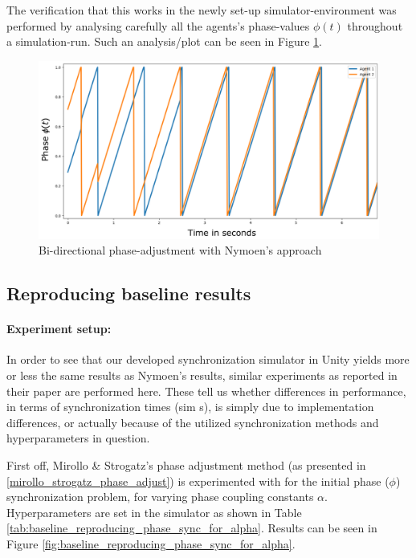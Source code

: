 		The verification that this works in the newly set-up simulator-environment was performed by analysing carefully all the agents's phase-values $\phi(t)$ throughout a simulation-run. Such an analysis/plot can be seen in Figure \ref{fig:nymoen_phase}.
		
		\begin{figure}[h]
			\centering
			\includegraphics[width=0.9\linewidth]{Assets/DocSegments/Chapters/ExperimentsAndResults/Figures/Validations/KNymoenPhaseAdjustmentSecondTry.pdf}
			\caption[Illustration of Nymoen's bi-directional phase adjustment ($Adj_{\phi}$) method.]{Bi-directional phase-adjustment with Nymoen's approach}
			\label{fig:nymoen_phase}
		\end{figure}
	
	\subsection{Reproducing baseline results}
	
		\paragraph{Experiment setup:\nl}
		
		In order to see that our developed synchronization simulator in Unity yields more or less the same results as Nymoen's results, similar experiments as reported in their paper are performed here. These tell us whether differences in performance, in terms of synchronization times (sim s), is simply due to implementation differences, or actually because of the utilized synchronization methods and hyperparameters in question. 
		
		First off, Mirollo \& Strogatz's phase adjustment method (as presented in \ref{mirollo_strogatz_phase_adjust}) is experimented with for the initial phase ($\phi$) synchronization problem, for varying phase coupling constants $\alpha$. Hyperparameters are set in the simulator as shown in Table \ref{tab:baseline_reproducing_phase_sync_for_alpha}. Results can be seen in Figure \ref{fig:baseline_reproducing_phase_sync_for_alpha}.
		
